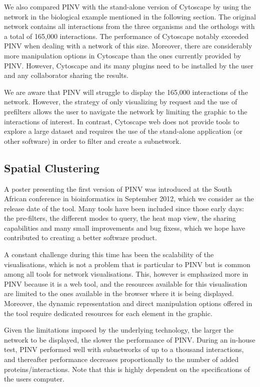 We also compared PINV with the stand-alone version of Cytoscape by using the network in the biological example mentioned in the following section. The original network contains all interactions from the three organisms and the orthologs with a total of 165,000 interactions. 
The performance of Cytoscape notably exceeded PINV when dealing with a network of this size. Moreover, there are considerably more manipulation options in Cytoscape than the ones currently provided by PINV. However, Cytoscape and its many plugins need to be installed by the user and any collaborator sharing the results.

We are aware that PINV will struggle to display the 165,000 interactions of the network. However, the strategy of only visualizing by request and the use of prefilters  allows the user to navigate the network by limiting the graphic to the interactions of interest. In contrast, Cytoscape web does not provide tools to explore a large dataset and requires the use of the stand-alone application (or other software) in order to filter and create a subnetwork.


\subsection{Spatial Clustering} \label{section:clustering}
A poster presenting the first version of PINV was introduced at the South African conference in bioinformatics in September 2012, which we consider as the release date of the tool. Many tools have been included since those early days: the pre-filters, the different modes to query, the heat map view, the sharing capabilities and many small improvements and bug fixess, which we hope have contributed to creating a better software product.

A constant challenge during this time has been the scalability of the visualisations, which is not a problem that is particular to PINV but is common among all tools for network visualisations. This, however is emphasized more in PINV because it is a web tool, and the resources available for this visualisation are limited to the ones available in the browser where it is being displayed. Moreover, the dynamic representation and direct manipulation options offered in the tool require dedicated resources for each element in the graphic.

Given the limitations imposed by the underlying technology, the larger the network to be displayed, the slower the performance of PINV. During an in-house test, PINV performed well with subnetworks of up to a thousand interactions, and thereafter performance decreases proportionally to the number of added proteins/interactions. Note that this is highly dependent on the specifications of the users computer. 

